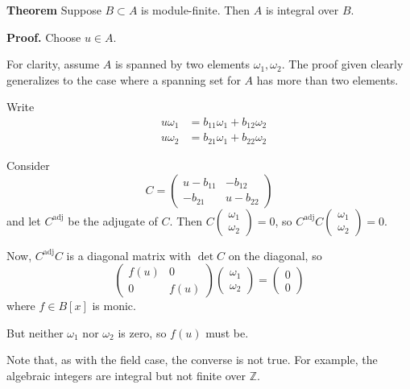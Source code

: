 \documentclass[12pt]{article}
\newcommand{\Ints}{\mathbb{Z}}
\begin{document}
\textbf{Theorem} Suppose $B\subset A$ is module-finite. Then $A$ is integral over $B$.

\textbf{Proof.} 
Choose $u\in A$.

For clarity, assume $A$ is spanned by two elements $\omega_1,\omega_2$. The proof given clearly generalizes to the case where a spanning set for $A$ has more than two elements.

Write
\begin{eqnarray*}
&u\omega_1&=b_{11}\omega_1+b_{12}\omega_2\\
&u\omega_2&=b_{21}\omega_1+b_{22}\omega_2
\end{eqnarray*}

Consider
\[C=\left(\begin{array}{cc}
u-b_{11}&-b_{12}\\
-b_{21}&u-b_{22}\end{array}\right)\]
and let $C^{\mathrm{adj}}$ be the adjugate of $C$.
Then $C\left(\begin{array}{c}\omega_1\\
\omega_2\end{array}\right)=0$, so
$C^{\mathrm{adj}}C\left(\begin{array}{c}\omega_1\\
\omega_2\end{array}\right)=0$.

Now, $C^{\mathrm{adj}}C$ is a diagonal matrix with $\det C$ on the diagonal, so
\[\left(\begin{array}{cc}f(u)&0\\
0&f(u)\end{array}\right)\left(\begin{array}{c}\omega_1\\
\omega_2\end{array}\right)=\left(\begin{array}{c}0\\
0\end{array}\right)\]
where $f\in B[x]$ is monic.

But neither $\omega_1$ nor $\omega_2$ is zero, so $f(u)$ must be.

Note that, as with the field case, the converse is not true. For example, the algebraic integers are integral but not finite over $\Ints$.
\end{document}
